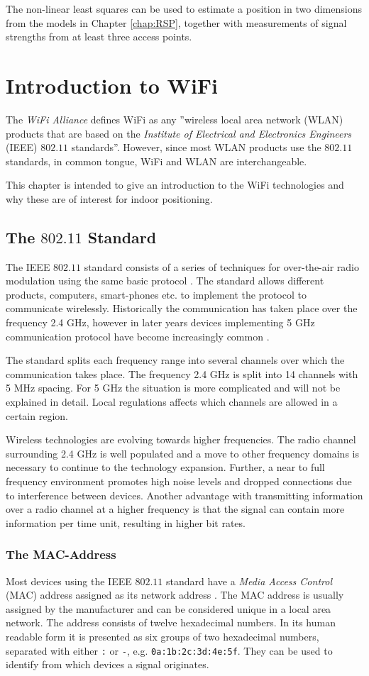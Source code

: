 \documentclass{LTHthesis}
\begin{document}
The non-linear least squares can be used to estimate a position in two dimensions from the models in Chapter \ref{chap:RSP}, together with measurements of signal
 strengths from at least three access points. 
%
\chapter{Introduction to WiFi} %
The \emph{WiFi Alliance} defines WiFi as any ''wireless local area network (WLAN) products that are based on the \emph{Institute of Electrical and Electronics Engineers} (IEEE) $802.11$ standards''. However, since most WLAN products use the $802.11$ standards, in common tongue, WiFi and WLAN are interchangeable.    

This chapter is intended to give an introduction to the WiFi technologies and why these are of interest for indoor positioning.
%
\section{The $802.11$ Standard}
%
The IEEE $802.11$ standard consists of a series of techniques for over-the-air radio modulation using the same basic protocol \cite{IEEE:802.11}. The standard allows different products, computers, smart-phones etc. to implement the protocol to communicate wirelessly. Historically the communication has taken place over the frequency 2.4 GHz, however in later years devices implementing 5 GHz communication protocol have become increasingly common \cite{walrand10}.

The standard splits each frequency range into several channels over which the communication takes place. The frequency 2.4 GHz is split into 14 channels with 5 MHz spacing. For 5 GHz the situation is more complicated and will not be explained in detail. Local regulations affects which channels are allowed in a certain region.   

Wireless technologies are evolving towards higher frequencies. The radio channel  surrounding 2.4 GHz is well populated and a move to other frequency domains is necessary to continue to the technology expansion. Further, a near to full frequency environment promotes high noise levels and dropped connections due to interference between devices. Another advantage with transmitting information over a radio channel at a higher frequency is that the signal can contain more information per time unit, resulting in higher bit rates.    
%
\subsection{The MAC-Address}
%
Most devices using the IEEE $802.11$ standard have a \emph{Media Access Control} (MAC) address assigned as its network address \cite{IEEE:802.11}. The MAC address is usually assigned by the manufacturer and can be considered unique in a local area network. The address consists of twelve hexadecimal numbers. In its human readable form it is presented as six groups of two hexadecimal numbers, separated with either \verb|:| or \verb|-|, e.g. \verb|0a:1b:2c:3d:4e:5f|. They can be used to identify from which devices a signal originates.
%
\end{document}
